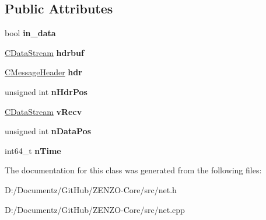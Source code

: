 \subsection*{Public Attributes}
\begin{DoxyCompactItemize}
\item 
\mbox{\label{class_c_net_message_a8f399ad7225f980bdab3ede17b1b23af}} 
bool {\bfseries in\+\_\+data}
\item 
\mbox{\label{class_c_net_message_a80a6f95f0c187aa97788118248cbf452}} 
\mbox{\hyperlink{class_c_data_stream}{C\+Data\+Stream}} {\bfseries hdrbuf}
\item 
\mbox{\label{class_c_net_message_ae7215dca62862a3688f7eeb94646c377}} 
\mbox{\hyperlink{class_c_message_header}{C\+Message\+Header}} {\bfseries hdr}
\item 
\mbox{\label{class_c_net_message_a1a500121037490eec4b238906f3a23ad}} 
unsigned int {\bfseries n\+Hdr\+Pos}
\item 
\mbox{\label{class_c_net_message_a1a25c16099d01362e1663390a2e06d1a}} 
\mbox{\hyperlink{class_c_data_stream}{C\+Data\+Stream}} {\bfseries v\+Recv}
\item 
\mbox{\label{class_c_net_message_a418f59287d1805dda6959f27a170c855}} 
unsigned int {\bfseries n\+Data\+Pos}
\item 
\mbox{\label{class_c_net_message_a99d5bbca862ac4b7a88b71a7b679decc}} 
int64\+\_\+t {\bfseries n\+Time}
\end{DoxyCompactItemize}


The documentation for this class was generated from the following files\+:\begin{DoxyCompactItemize}
\item 
D\+:/\+Documentz/\+Git\+Hub/\+Z\+E\+N\+Z\+O-\/\+Core/src/net.\+h\item 
D\+:/\+Documentz/\+Git\+Hub/\+Z\+E\+N\+Z\+O-\/\+Core/src/net.\+cpp\end{DoxyCompactItemize}
